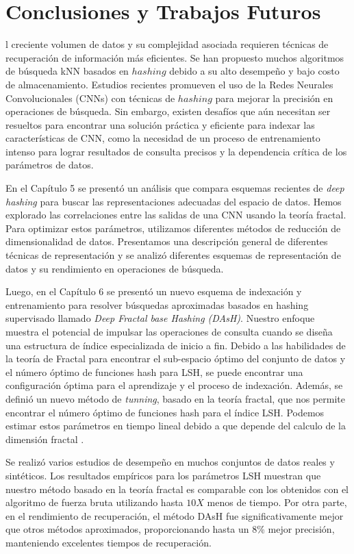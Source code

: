 \chapter{Conclusiones y Trabajos Futuros}
 
l creciente volumen de datos y su complejidad asociada requieren técnicas de recuperación de información   más eficientes. Se han propuesto muchos algoritmos de búsqueda kNN basados  en  $hashing$  debido a su alto desempeño  y bajo costo de almacenamiento. Estudios recientes promueven el uso de la Redes Neurales Convolucionales (CNNs) con técnicas de $hashing$ para mejorar la precisión en operaciones de búsqueda. Sin embargo, existen desafíos que aún necesitan ser resueltos   para encontrar una solución práctica y eficiente para indexar las características de CNN, como la necesidad de un proceso de entrenamiento intenso para lograr resultados de consulta precisos y la dependencia crítica de los parámetros de datos.

En el Capítulo 5 se presentó un análisis  que compara esquemas recientes de \textit{deep hashing} para  buscar las   representaciones adecuadas del espacio de datos. Hemos explorado las correlaciones entre las salidas de una CNN usando la teoría fractal. Para optimizar estos parámetros, utilizamos diferentes métodos de reducción de dimensionalidad de datos. Presentamos una descripción general de  diferentes técnicas de representación y se analizó  diferentes esquemas  de representación de datos y  su rendimiento en operaciones de búsqueda. 

Luego, en el Capítulo 6  se presentó  un nuevo esquema de indexación y entrenamiento para resolver   búsquedas aproximadas  basados en  hashing supervisado llamado \textit{Deep Fractal base Hashing (DAsH)}. Nuestro enfoque muestra el potencial de impulsar las operaciones de consulta cuando se diseña una estructura de índice especializada de inicio a fin. Debido a las habilidades de la teoría de Fractal para encontrar el sub-espacio óptimo del conjunto de datos y el número óptimo de funciones hash para LSH, se puede encontrar una configuración óptima para el aprendizaje y el proceso de indexación. Además, se definió  un nuevo método de \textit{tunning}, basado en la teoría fractal, que nos permite encontrar el número óptimo de funciones hash para el índice LSH. Podemos estimar estos parámetros en tiempo lineal debido a que depende del calculo de la dimensión fractal .

Se realizó varios  estudios de desempeño en muchos conjuntos de datos reales y sintéticos. Los resultados empíricos para los parámetros LSH muestran que nuestro método basado en la teoría fractal es comparable con los obtenidos con el algoritmo de fuerza bruta utilizando hasta $10X$ menos de tiempo. Por otra parte, en el rendimiento de recuperación, el método DAsH fue significativamente mejor que otros métodos aproximados, proporcionando hasta un 8\% mejor precisión, manteniendo excelentes tiempos de recuperación.


